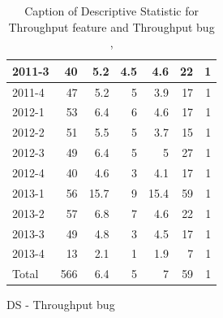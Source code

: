 \documentclass[UKenglish]{ifimaster}  %
\begin{document}
\begin{appendices}
\begin{table}[!htbp]
\begin{adjustwidth}{-2.5cm}{}
\begin{subfigure}[b]{0.3\textwidth}
{\begin{tabular}{ | l | r | r | r | r | r | r | }
 2011-3  & 40 & 5.2 & 4.5 & 4.6 & 22 & 1 \\ \hline
 2011-4  & 47 & 5.2 & 5 & 3.9 & 17 & 1 \\ \hline
 2012-1  & 53 & 6.4 & 6 & 4.6 & 17 & 1 \\ \hline
 2012-2  & 51 & 5.5 & 5 & 3.7 & 15 & 1 \\ \hline
 2012-3  & 49 & 6.4 & 5 & 5 & 27 & 1 \\ \hline
 2012-4  & 40 & 4.6 & 3 & 4.1 & 17 & 1 \\ \hline
 2013-1  & 56 & 15.7 & 9 & 15.4 & 59 & 1 \\ \hline
 2013-2  & 57 & 6.8 & 7 & 4.6 & 22 & 1 \\ \hline
 2013-3  & 49 & 4.8 & 3 & 4.5 & 17 & 1 \\ \hline
 2013-4  & 13 & 2.1 & 1 & 1.9 & 7 & 1 \\ \hline
 Total  & 566 & 6.4 & 5 & 7 & 59 & 1 \\ \hline
\end{tabular}
}
\caption{DS - Throughput bug}
 \label{DS:TPB:5}
\end{subfigure}
\end{adjustwidth}
\caption[Optional caption for list of figures]{Caption of Descriptive Statistic for Throughput feature and Throughput bug  , }
\label{DS:5:2}
\end{table}



\end{appendices}
\end{document}
